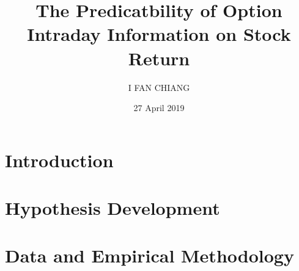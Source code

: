 \documentclass[oneside,12pt]{article}
\title{\textbf{The Predicatbility of Option Intraday Information on Stock Return}}
\author{I FAN CHIANG}
\date{27 April 2019}
\begin{document}
\maketitle

\begin{abstract}
\centering

\end{abstract}


\fontsize{13pt}{18pt}\selectfont
\section{Introduction}\label{ch:Introduction}



\fontsize{13pt}{18pt}\selectfont
\section{Hypothesis Development}


\fontsize{13pt}{18pt}\selectfont
\section{Data and Empirical Methodology}




\newpage
\printbibliography
\end{document}
